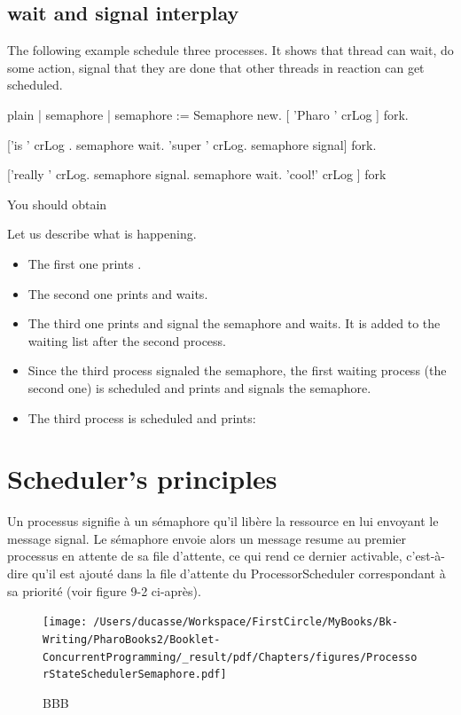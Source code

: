 \documentclass[10pt,twoside,english]{_support/latex/sbabook/sbabook}
\begin{document}
\section{wait and signal interplay}
The following example schedule three processes. It shows that thread can wait, do some action, signal that they are done that other threads in reaction can get scheduled.

\begin{displaycode}{plain}
| semaphore |
semaphore := Semaphore new. 
[ 'Pharo ' crLog ] fork. 

['is ' crLog .
semaphore wait.
'super ' crLog. 
semaphore signal] fork.

['really ' crLog. 
semaphore signal.
semaphore wait.
'cool!' crLog ] fork
\end{displaycode}

You should obtain 

Let us describe what is happening. 

\begin{itemize}
\item The first one prints . 
\item The second one prints  and waits.
\item The third one prints  and signal the semaphore and waits. It is added to the waiting list after the second process.
\item Since the third process signaled the semaphore, the first waiting process (the second one) is scheduled and prints  and signals the semaphore. 
\item The third process is scheduled and prints: 
\end{itemize}
\chapter{Scheduler's principles}
Un processus signifie \`{a} un s\'{e}maphore qu’il lib\`{e}re la ressource en lui envoyant le message signal. 
Le s\'{e}maphore envoie alors un message resume au premier processus en attente de sa file d’attente, 
ce qui rend ce dernier activable, c’est-\`{a}-dire qu’il est ajout\'{e} dans la file d’attente du 
ProcessorScheduler correspondant \`{a} sa priorit\'{e} (voir figure 9-2 ci-apr\`{e}s).


\begin{figure}

\begin{center}
\texttt{[image: /Users/ducasse/Workspace/FirstCircle/MyBooks/Bk-Writing/PharoBooks2/Booklet-ConcurrentProgramming/\_result/pdf/Chapters/figures/ProcessorStateSchedulerSemaphore.pdf]}\caption{BBB\label{ProcessorStateSchedulerSemaphore}}\end{center}
\end{figure}
\end{document}
